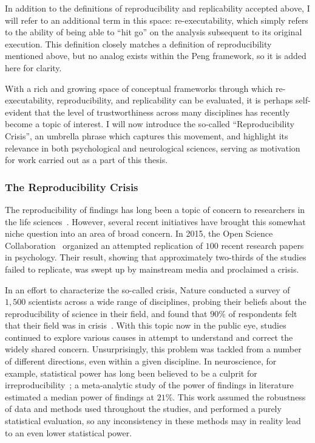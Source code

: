 In addition to the definitions of reproducibility and replicability accepted above, I will refer to an additional term
in this space: re-executability, which simply refers to the ability of being able to ``hit go'' on the analysis
subsequent to its original execution. This definition closely matches a definition of reproducibility mentioned above,
but no analog exists within the Peng framework, so it is added here for clarity.

With a rich and growing space of conceptual frameworks through which re-executability, reproducibility, and
replicability can be evaluated, it is perhaps self-evident that the level of trustworthiness across many disciplines
has recently become a topic of interest. I will now introduce the so-called ``Reproducibility Crisis'', an umbrella
phrase which captures this movement, and highlight its relevance in both psychological and neurological sciences,
serving as motivation for work carried out as a part of this thesis.

\subsubsection{The Reproducibility Crisis}

The reproducibility of findings has long been a topic of concern to researchers in the life
sciences~\cite{ioannidis2005most,begley2012raise,prinz2011believe,mcnutt2014reproducibility}. However, several recent
initiatives have brought this somewhat niche question into an area of broad concern. In 2015, the Open Science
Collaboration~\cite{open2015estimating} organized an attempted replication of $100$ recent research papers in
psychology. Their result, showing that approximately two-thirds of the studies failed to replicate, was swept up by
mainstream media and proclaimed a crisis.

In an effort to characterize the so-called crisis, Nature conducted a survey of $1,500$ scientists across a wide
range of disciplines, probing their beliefs about the reproducibility of science in their field, and found that $90\%$
of respondents felt that their field was in crisis~\cite{baker20161}. With this topic now in the public eye, studies
continued to explore various causes in attempt to understand and correct the widely shared concern. Unsurprisingly,
this problem was tackled from a number of different directions, even within a given discipline. In neuroscience, for
example, statistical power has long been believed to be a culprit for irreproducibility~\cite{button2013power}; a
meta-analytic study of the power of findings in literature estimated a median power of findings at $21\%$. This work
assumed the robustness of data and methods used throughout the studies, and performed a purely statistical evaluation,
so any inconsistency in these methods may in reality lead to an even lower statistical power.

